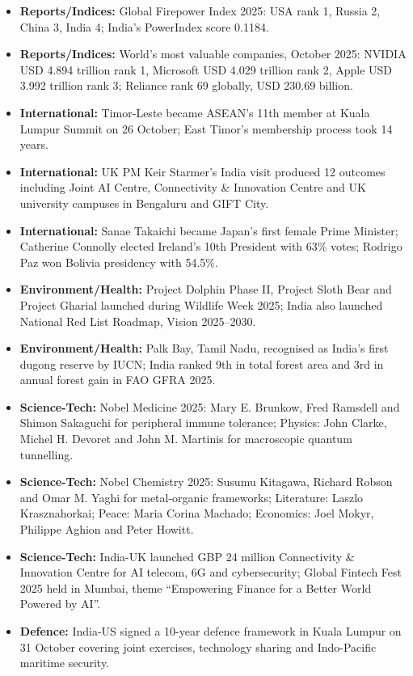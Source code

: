 \documentclass[10pt,a4paper]{article}
\begin{document}
\begin{itemize}
    \item \textbf{Reports/Indices:} Global Firepower Index 2025: USA rank 1, Russia 2, China 3, India 4; India's PowerIndex score 0.1184.
    \item \textbf{Reports/Indices:} World's most valuable companies, October 2025: NVIDIA USD 4.894 trillion rank 1, Microsoft USD 4.029 trillion rank 2, Apple USD 3.992 trillion rank 3; Reliance rank 69 globally, USD 230.69 billion.
    \item \textbf{International:} Timor-Leste became ASEAN's 11th member at Kuala Lumpur Summit on 26 October; East Timor's membership process took 14 years.
    \item \textbf{International:} UK PM Keir Starmer's India visit produced 12 outcomes including Joint AI Centre, Connectivity \& Innovation Centre and UK university campuses in Bengaluru and GIFT City.
    \item \textbf{International:} Sanae Takaichi became Japan's first female Prime Minister; Catherine Connolly elected Ireland's 10th President with 63\% votes; Rodrigo Paz won Bolivia presidency with 54.5\%.
    \item \textbf{Environment/Health:} Project Dolphin Phase II, Project Sloth Bear and Project Gharial launched during Wildlife Week 2025; India also launched National Red List Roadmap, Vision 2025--2030.
    \item \textbf{Environment/Health:} Palk Bay, Tamil Nadu, recognised as India's first dugong reserve by IUCN; India ranked 9th in total forest area and 3rd in annual forest gain in FAO GFRA 2025.
    \item \textbf{Science-Tech:} Nobel Medicine 2025: Mary E. Brunkow, Fred Ramsdell and Shimon Sakaguchi for peripheral immune tolerance; Physics: John Clarke, Michel H. Devoret and John M. Martinis for macroscopic quantum tunnelling.
    \item \textbf{Science-Tech:} Nobel Chemistry 2025: Susumu Kitagawa, Richard Robson and Omar M. Yaghi for metal-organic frameworks; Literature: Laszlo Krasznahorkai; Peace: Maria Corina Machado; Economics: Joel Mokyr, Philippe Aghion and Peter Howitt.
    \item \textbf{Science-Tech:} India-UK launched GBP 24 million Connectivity \& Innovation Centre for AI telecom, 6G and cybersecurity; Global Fintech Fest 2025 held in Mumbai, theme ``Empowering Finance for a Better World Powered by AI''.
    \item \textbf{Defence:} India-US signed a 10-year defence framework in Kuala Lumpur on 31 October covering joint exercises, technology sharing and Indo-Pacific maritime security.

\end{itemize}
\end{document}
